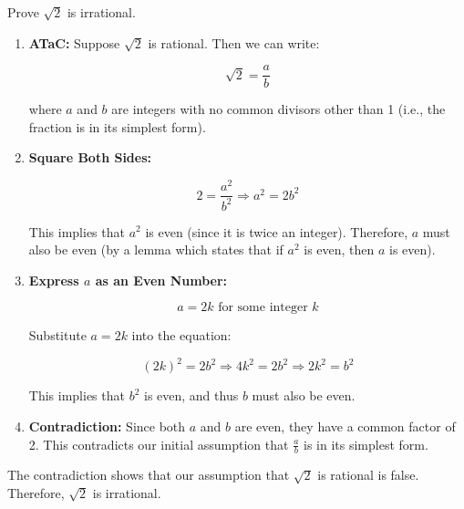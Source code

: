     \begin{example}
        Prove $\sqrt{2}$ is irrational.
        \begin{enumerate}
            \item \textbf{ATaC:} Suppose \(\sqrt{2}\) is rational. Then we can write:
            
            \[
            \sqrt{2} = \frac{a}{b}
            \]
            
            where \( a \) and \( b \) are integers with no common divisors other than 1 (i.e., the fraction is in its simplest form).
            \vspace{1em}
            \item \textbf{Square Both Sides:}
            
            \[
            2 = \frac{a^2}{b^2}
            \Rightarrow a^2 = 2b^2
            \]
            
            This implies that \( a^2 \) is even (since it is twice an integer). Therefore, \( a \) must also be even (by a lemma which states that if \( a^2 \) is even, then \( a \) is even).
            \vspace{1em}

            \item \textbf{Express \( a \) as an Even Number:}
            
            \[
            a = 2k \text{ for some integer } k
            \]
            
            Substitute \( a = 2k \) into the equation:
            
            \[
            (2k)^2 = 2b^2 \Rightarrow 4k^2 = 2b^2 \Rightarrow 2k^2 = b^2
            \]
            
            This implies that \( b^2 \) is even, and thus \( b \) must also be even.
            \vspace{1em}
            \item \textbf{Contradiction:} Since both \( a \) and \( b \) are even, they have a common factor of 2. This contradicts our initial assumption that \( \frac{a}{b} \) is in its simplest form.
            \vspace{1em}
        
        \end{enumerate}
        The contradiction shows that our assumption that \(\sqrt{2}\) is rational is false. Therefore, \(\sqrt{2}\) is irrational.
    \end{example}
